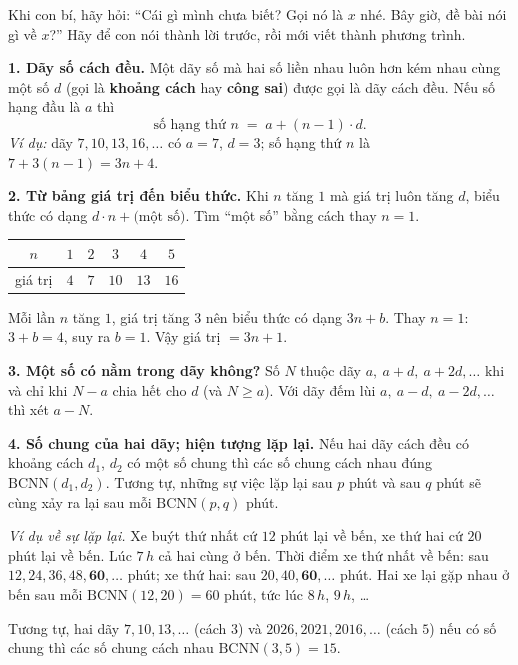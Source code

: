 \begin{parentbox}
Khi con bí, hãy hỏi: ``Cái gì mình chưa biết? Gọi nó là $x$ nhé. Bây giờ, đề bài nói gì về $x$?''
Hãy để con nói thành lời trước, rồi mới viết thành phương trình.
\end{parentbox}

\begin{knowbox}
\textbf{1. Dãy số cách đều.} Một dãy số mà hai số liền nhau luôn hơn kém nhau cùng một số $d$ (gọi là
\textbf{khoảng cách} hay \textbf{công sai}) được gọi là dãy cách đều. Nếu số hạng đầu là $a$ thì
\[\text{số hạng thứ } n \;=\; a+(n-1)\cdot d .\]
\emph{Ví dụ:} dãy $7,10,13,16,\dots$ có $a=7$, $d=3$; số hạng thứ $n$ là $7+3(n-1)=3n+4$.

\textbf{2. Từ bảng giá trị đến biểu thức.} Khi $n$ tăng $1$ mà giá trị luôn tăng $d$, biểu thức có dạng
$d\cdot n+\text{(một số)}$. Tìm ``một số'' bằng cách thay $n=1$.
\begin{center}
\begin{tabular}{|c|c|c|c|c|c|}
\hline
\rowcolor{tmBlue!10} $n$ & $1$ & $2$ & $3$ & $4$ & $5$\\ \hline
giá trị & $4$ & $7$ & $10$ & $13$ & $16$\\ \hline
\end{tabular}
\end{center}
Mỗi lần $n$ tăng $1$, giá trị tăng $3$ nên biểu thức có dạng $3n+b$. Thay $n=1$: $3+b=4$, suy ra $b=1$. Vậy giá trị $=3n+1$.

\textbf{3. Một số có nằm trong dãy không?} Số $N$ thuộc dãy $a,\ a+d,\ a+2d,\dots$ khi và chỉ khi
$N-a$ chia hết cho $d$ (và $N\ge a$). Với dãy đếm lùi $a,\ a-d,\ a-2d,\dots$ thì xét $a-N$.

\textbf{4. Số chung của hai dãy; hiện tượng lặp lại.} Nếu hai dãy cách đều có khoảng cách $d_1$, $d_2$ có một số chung thì
các số chung cách nhau đúng $\text{BCNN}(d_1,d_2)$. Tương tự, những sự việc lặp lại sau $p$ phút và sau $q$ phút sẽ
cùng xảy ra lại sau mỗi $\text{BCNN}(p,q)$ phút.
\end{knowbox}

\begin{tipbox}
\emph{Ví dụ về sự lặp lại.} Xe buýt thứ nhất cứ $12$ phút lại về bến, xe thứ hai cứ $20$ phút lại về bến. Lúc $7\,h$ cả hai cùng ở bến.
Thời điểm xe thứ nhất về bến: sau $12, 24, 36, 48, \mathbf{60},\dots$ phút; xe thứ hai: sau $20, 40, \mathbf{60},\dots$ phút.
Hai xe lại gặp nhau ở bến sau mỗi $\text{BCNN}(12,20)=60$ phút, tức lúc $8\,h$, $9\,h$, \dots

Tương tự, hai dãy $7,10,13,\dots$ (cách $3$) và $2026,2021,2016,\dots$ (cách $5$) nếu có số chung thì các số chung cách nhau $\text{BCNN}(3,5)=15$.
\end{tipbox}

